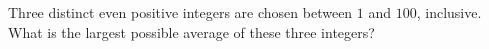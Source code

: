 Three distinct even positive integers are chosen between $1$ and $100$, inclusive. What is the largest possible average of these three integers?
